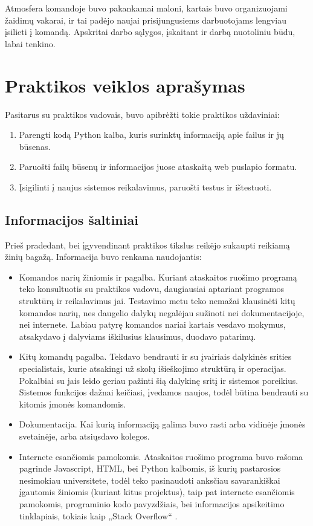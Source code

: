 \documentclass{VUMIFPSkursinis}
\begin{document}
Atmosfera komandoje buvo pakankamai maloni, kartais buvo organizuojami žaidimų vakarai, ir tai padėjo naujai prisijungusiems darbuotojams lengviau įsilieti į komandą. Apskritai darbo sąlygos, įskaitant ir darbą nuotoliniu būdu, labai tenkino.


\section{Praktikos veiklos aprašymas}
Pasitarus su praktikos vadovais, buvo apibrėžti tokie praktikos uždaviniai:
\begin{enumerate}
    \item Parengti kodą Python kalba, kuris surinktų informaciją apie failus ir jų būsenas.
    \item Paruošti failų būsenų ir informacijos juose ataskaitą web puslapio formatu.
    \item Įsigilinti į naujus sistemos reikalavimus, paruošti testus ir ištestuoti.
\end{enumerate}

\subsection{Informacijos šaltiniai}
Prieš pradedant, bei įgyvendinant praktikos tikslus reikėjo sukaupti reikiamą žinių bagažą. Informacija buvo renkama naudojantis:
\begin{itemize}
    \item Komandos narių žiniomis ir pagalba. Kuriant ataskaitos ruošimo programą teko konsultuotis su praktikos vadovu, daugiausiai aptariant programos struktūrą ir reikalavimus jai. Testavimo metu teko nemažai klausinėti kitų komandos narių, nes daugelio dalykų negalėjau sužinoti nei dokumentacijoje, nei internete. Labiau patyrę komandos nariai kartais vesdavo mokymus, atsakydavo į dalyviams iškilusius klausimus, duodavo patarimų.
    \item Kitų komandų pagalba. Tekdavo bendrauti ir su įvairiais dalykinės srities specialistais, kurie atsakingi už skolų išieškojimo struktūrą ir operacijas. Pokalbiai su jais leido geriau pažinti šią dalykinę sritį ir sistemos poreikius. Sistemos funkcijos dažnai keičiasi, įvedamos naujos, todėl būtina bendrauti su kitomis įmonės komandomis.
    \item Dokumentacija. Kai kurią informaciją galima buvo rasti arba vidinėje įmonės svetainėje, arba atsiųsdavo kolegos.
    \item Internete esančiomis pamokomis. Ataskaitos ruošimo programa buvo rašoma pagrinde Javascript, HTML, bei Python kalbomis, iš kurių pastarosios nesimokiau universitete, todėl teko pasinaudoti anksčiau savarankiškai įgautomis žiniomis (kuriant kitus projektus), taip pat internete esančiomis pamokomis, programinio kodo pavyzdžiais, bei informacijos apsikeitimo tinklapiais, tokiais kaip „Stack Overflow“ \cite{StackOverflow}.
\end{itemize}
\end{document}

